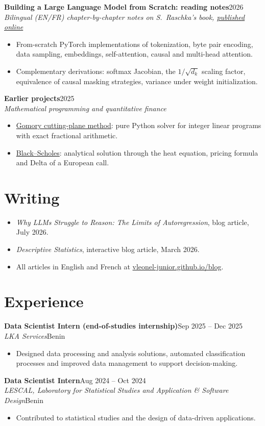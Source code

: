 \documentclass[10pt,a4paper]{article}
\newcommand{\entry}[4]{%
  \textbf{#1}\hfill{\color{muted}#2}\\
  \textit{#3}\hfill{\color{muted}\small #4}\par\vspace{2pt}}
\newcommand{\details}[1]{%
  \begin{itemize}[leftmargin=1.1em, label={\color{muted}\textbullet}, itemsep=1pt, topsep=1pt]
  #1
  \end{itemize}\vspace{5pt}}
\begin{document}
\entry{Building a Large Language Model from Scratch: reading notes}{2026}
      {Bilingual (EN/FR) chapter-by-chapter notes on S.~Raschka's book, \href{https://vleonel-junior.github.io/blog/dossier/build-llm-from-scratch/}{published online}}{}
\details{
  \item From-scratch PyTorch implementations of tokenization, byte pair encoding, data sampling, embeddings, self-attention, causal and multi-head attention.
  \item Complementary derivations: softmax Jacobian, the $1/\sqrt{d_k}$ scaling factor, equivalence of causal masking strategies, variance under weight initialization.
}

\entry{Earlier projects}{2025}{Mathematical programming and quantitative finance}{}
\details{
  \item \href{https://github.com/vleonel-junior/Gomory}{Gomory cutting-plane method}: pure Python solver for integer linear programs with exact fractional arithmetic.
  \item \href{https://github.com/vleonel-junior/Black-sholes}{Black--Scholes}: analytical solution through the heat equation, pricing formula and Delta of a European call.
}

\section{Writing}
\details{
  \item \textit{Why LLMs Struggle to Reason: The Limits of Autoregression}, blog article, July 2026.
  \item \textit{Descriptive Statistics}, interactive blog article, March 2026.
  \item All articles in English and French at \href{https://vleonel-junior.github.io/blog/}{vleonel-junior.github.io/blog}.
}

\section{Experience}
\entry{Data Scientist Intern (end-of-studies internship)}{Sep 2025 -- Dec 2025}
      {LKA Services}{Benin}
\details{\item Designed data processing and analysis solutions, automated classification processes and improved data management to support decision-making.}

\entry{Data Scientist Intern}{Aug 2024 -- Oct 2024}
      {LESCAL, Laboratory for Statistical Studies and Application \& Software Design}{Benin}
\details{\item Contributed to statistical studies and the design of data-driven applications.}
\end{document}
